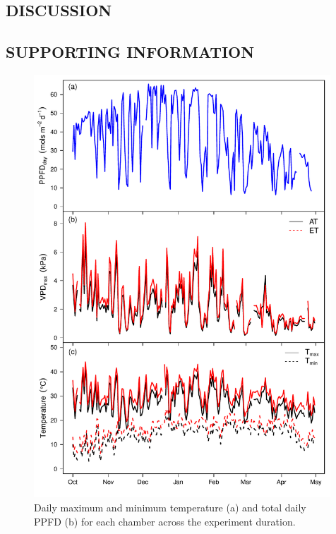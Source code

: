 \documentclass[a4paper]{article}\usepackage[]{graphicx}\usepackage[]{color}
\begin{document}
\subsection*{DISCUSSION}
\subsection*{SUPPORTING INFORMATION}

\begin{figure}[h!]
    \centering
    \includegraphics[width=0.99\textwidth]{airvars_wtc3.pdf}
    \caption{Daily maximum and minimum temperature (a) and total daily PPFD (b) for each chamber across the experiment duration.}
    \label{fig:figure 3.S1}
\end{figure}
\end{document}
